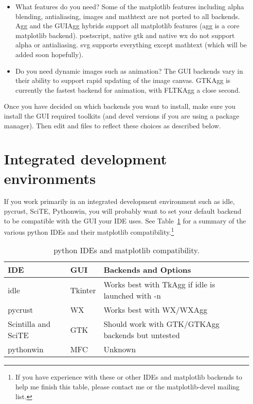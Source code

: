 \documentclass[]{book}
\begin{document}
\begin{itemize}
\item What features do you need?  Some of the matplotlib features
  including alpha blending, antialiasing, images and mathtext are not
  ported to all backends.  Agg and the GUIAgg hybrids support all
  matplotlib features (agg is a core matplotlib backend).  postscript,
  native gtk and native wx do not support alpha or antialiasing.  svg
  supports everything except mathtext (which will be added soon
  hopefully).

\item Do you need dynamic images such as animation?  The GUI backends
  vary in their ability to support rapid updating of the image
  canvas.  GTKAgg is currently the fastest backend for animation,
  with FLTKAgg a close second.
\end{itemize}

Once you have decided on which backends you want to install, make sure
you install the GUI required toolkits (and devel versions if you are
using a package manager).  Then edit  and
 files to reflect these choices as described
below.

\section{Integrated development environments}
\label{sec:ides}

If you work primarily in an integrated development environment such as
idle, pycrust, SciTE, Pythonwin, you will probably want to set your
default backend to be compatible with the GUI your IDE uses. See
Table~\ref{tab:ides} for a summary of the various python IDEs and
their matplotlib compatibility.\footnote{If you have experience with
  these or other IDEs and matplotlib backends to help me finish this
  table, please contact me or the matplotlib-devel mailing list.}

\begin{table}[htbp]
  \centering
  \begin{tabular}[t]{|l|l|l|}\hline
  IDE & GUI & Backends and Options\\\hline
  idle & Tkinter & Works best with TkAgg if idle is launched with -n\\
  pycrust & WX & Works best with WX/WXAgg\\
  Scintilla and SciTE & GTK & Should work with GTK/GTKAgg backends but untested\\
  pythonwin & MFC & Unknown\\\hline

  \end{tabular}
  \caption{\label{tab:ides}python IDEs and matplotlib compatibility.
  }
\end{table}
\end{document}

